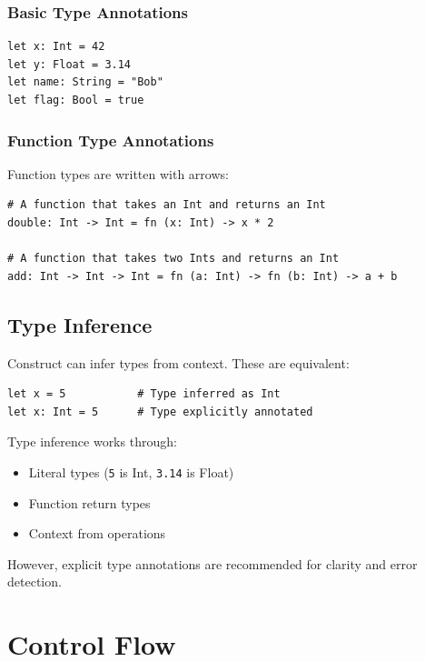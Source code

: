 \documentclass[11pt,twoside,openright]{book}
\begin{document}
\subsection{Basic Type Annotations}

\begin{lstlisting}[language=ConstructLang]
let x: Int = 42
let y: Float = 3.14
let name: String = "Bob"
let flag: Bool = true
\end{lstlisting}

\subsection{Function Type Annotations}

Function types are written with arrows:

\begin{lstlisting}[language=ConstructLang]
# A function that takes an Int and returns an Int
double: Int -> Int = fn (x: Int) -> x * 2

# A function that takes two Ints and returns an Int
add: Int -> Int -> Int = fn (a: Int) -> fn (b: Int) -> a + b
\end{lstlisting}

\section{Type Inference}

Construct can infer types from context. These are equivalent:

\begin{lstlisting}[language=ConstructLang]
let x = 5           # Type inferred as Int
let x: Int = 5      # Type explicitly annotated
\end{lstlisting}

Type inference works through:

\begin{itemize}
    \item Literal types (\texttt{5} is Int, \texttt{3.14} is Float)
    \item Function return types
    \item Context from operations
\end{itemize}

However, explicit type annotations are recommended for clarity and error detection.

\chapter{Control Flow}
\end{document}
